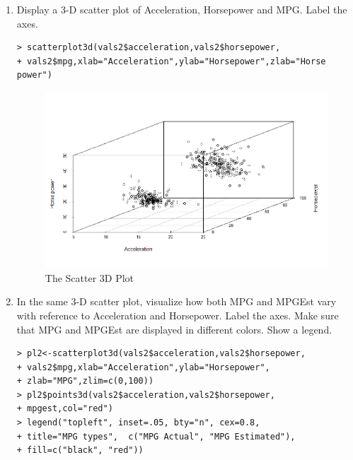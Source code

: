 \documentclass[fontsize=10pt]{scrartcl}
\begin{document}
\begin{enumerate}
		\begin{enumerate}
			\item
			Display a 3-D scatter plot of Acceleration, Horsepower and MPG. Label the axes. \\
\begin{verbatim}
> scatterplot3d(vals2$acceleration,vals2$horsepower,
+ vals2$mpg,xlab="Acceleration",ylab="Horsepower",zlab="Horse power")
\end{verbatim}
			\begin{figure}[H]
				\begin{center}
					\includegraphics[scale=.5]{resources/scatter3d.png}
					\caption{The Scatter 3D Plot}
				\end{center}
			\end{figure}

			\item
			In the same 3-D scatter plot, visualize how both MPG and MPGEst vary with reference to Acceleration and Horsepower. Label the axes. Make sure that MPG and MPGEst are displayed in different colors. Show a legend.
\begin{verbatim}
> pl2<-scatterplot3d(vals2$acceleration,vals2$horsepower,
+ vals2$mpg,xlab="Acceleration",ylab="Horsepower",
+ zlab="MPG",zlim=c(0,100))
> pl2$points3d(vals2$acceleration,vals2$horsepower,
+ mpgest,col="red")
> legend("topleft", inset=.05, bty="n", cex=0.8, 
+ title="MPG types",  c("MPG Actual", "MPG Estimated"), 
+ fill=c("black", "red"))
\end{verbatim}
			

\end{enumerate}
\end{enumerate}
\end{document}
